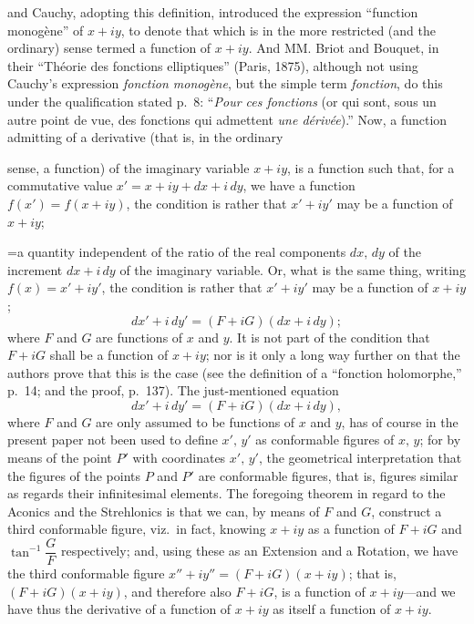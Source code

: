 \documentclass[11pt]{article}
\begin{document}
\medskip

\noindent
and Cauchy, adopting this definition, introduced the expression ``function monog\`ene''
of $x + iy$, to denote that which is in the more restricted (and the ordinary) sense
termed a function of $x + iy$. And MM. Briot and Bouquet, in their ``Th\'eorie des
fonctions elliptiques'' (Paris, 1875), although not using Cauchy's expression \textit{fonction
monog\`ene}, but the simple term \textit{fonction}, do this under the qualification stated p.~8: ``\textit{Pour
ces fonctions} (or qui sont, sous un autre point de vue, des fonctions qui admettent
\textit{une d\'eriv\'ee}).'' Now, a function admitting of a derivative (that is, in the ordinary
\newpage

\noindent
sense, a function) of the imaginary variable $x + iy$, is a function such that, for a
commutative value $x' = x + iy + dx + i\,dy$, we have a function $f(x') = f(x + iy)$,
the condition is rather that $x' + iy'$ may be a function of $x + iy$;

\medskip

\noindent
=a quantity independent of the ratio of the real components $dx,\,dy$ of the increment
$dx + i\,dy$ of the imaginary variable. Or, what is the same thing, writing $f(x) = x' + iy'$,
the condition is rather that $x' + iy'$ may be a function of $x + iy$;
\[
dx' + i\,dy' = (F + iG)(dx + i\,dy);
\]
where $F$ and $G$ are functions of $x$ and $y$. It is not part of the condition that
$F + iG$ shall be a function of $x + iy$; nor is it only a long way further on that the
authors prove that this is the case (see the definition of a ``fonction holomorphe,''
p.~14; and the proof, p.~137). The just-mentioned equation
\[
dx' + i\,dy' = (F + iG)(dx + i\,dy),
\]
where $F$ and $G$ are only assumed to be functions of $x$ and $y$, has of course in the
present paper not been used to define $x',\,y'$ as conformable figures of $x,\,y$; for by
means of the point $P'$ with coordinates $x',\,y'$, the geometrical interpretation that the
figures of the points $P$ and $P'$ are conformable figures, that is, figures similar as
regards their infinitesimal elements. The foregoing theorem in regard to the Aconics
and the Strehlonics is that we can, by means of $F$ and $G$, construct a third conformable
figure, viz.\ in fact, knowing $x + iy$ as a function of $F + iG$ and $\tan^{-1}\dfrac{G}{F}$ respectively;
and, using these as an Extension and a Rotation, we have the third conformable figure
$x'' + iy'' = (F + iG)(x + iy)$; that is, $(F + iG)(x + iy)$, and therefore also $F + iG$, is a
function of $x + iy$---and we have thus the derivative of a function of $x + iy$ as itself
a function of $x + iy$.
\end{document}
